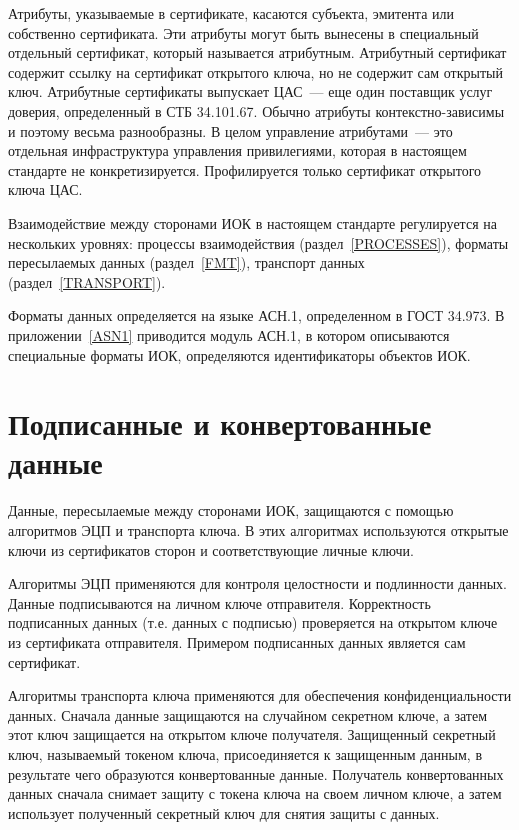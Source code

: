 Атрибуты, указываемые в сертификате, касаются субъекта, эмитента или 
собственно сертификата. Эти атрибуты могут быть вынесены в специальный 
отдельный сертификат, который называется атрибутным. Атрибутный  
сертификат содержит ссылку на сертификат открытого ключа, 
но не содержит сам открытый ключ. 
Атрибутные сертификаты выпускает ЦАС~--- еще один поставщик услуг доверия, 
определенный в СТБ 34.101.67. Обычно атрибуты контекстно-зависимы и поэтому 
весьма разнообразны. В целом управление атрибутами~---  
это отдельная  инфраструктура управления привилегиями, которая в настоящем 
стандарте не конкретизируется. Профилируется только сертификат открытого 
ключа ЦАС.

Взаимодействие между сторонами ИОК в настоящем стандарте регулируется на 
нескольких уровнях: процессы взаимодействия (раздел~\ref{PROCESSES}), 
форматы пересылаемых данных (раздел~\ref{FMT}), 
транспорт данных (раздел~\ref{TRANSPORT}).

Форматы данных определяется на языке АСН.1, определенном в ГОСТ 34.973.
В приложении~\ref{ASN1} приводится модуль АСН.1, в котором описываются
специальные форматы ИОК, определяются идентификаторы объектов ИОК.

\section{Подписанные и конвертованные данные}

Данные, пересылаемые между сторонами ИОК, защищаются с помощью 
алгоритмов ЭЦП и транспорта ключа. В этих алгоритмах используются
открытые ключи из сертификатов сторон и соответствующие личные ключи.
%

Алгоритмы ЭЦП применяются для контроля целостности и подлинности данных.
Данные подписываются на личном ключе отправителя. Корректность подписанных 
данных (т.е. данных с подписью) проверяется на открытом ключе из 
сертификата отправителя. Примером подписанных данных является сам сертификат. 

Алгоритмы транспорта ключа применяются для обеспечения конфиденциальности 
данных. Сначала данные защищаются на случайном секретном ключе, а затем 
этот ключ защищается на открытом ключе получателя. 
Защищенный секретный ключ, называемый токеном ключа, присоединяется к защищенным данным,
в результате чего образуются конвертованные данные. 
Получатель конвертованных данных сначала снимает защиту с токена ключа на своем 
личном ключе, а затем использует полученный секретный ключ для снятия 
защиты с данных.  


